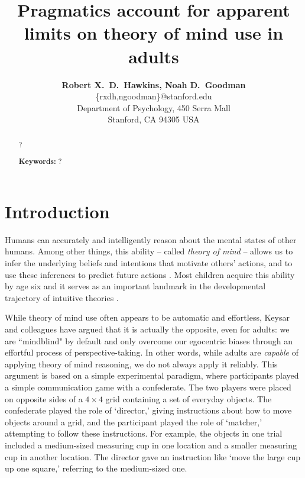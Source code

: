 \documentclass[10pt,letterpaper]{article}
\title{Pragmatics account for apparent limits on theory of mind use in adults}
\author{{\large \bf Robert X.~D.~Hawkins, Noah D.~Goodman}\\
  \{rxdh,ngoodman\}@stanford.edu\\
  Department of Psychology, 450 Serra Mall \\
  Stanford, CA 94305 USA}
\begin{document}
\maketitle

\begin{abstract}
?

\textbf{Keywords:} 
?
\end{abstract}

\section{Introduction}
\label{sec:intro}

Humans can accurately and intelligently reason about the mental states of other humans. Among other things, this ability -- called \emph{theory of mind} \cite{PremackWoodruff78_ChimpanzeeToM} -- allows us to infer the underlying beliefs and intentions that motivate others' actions, and to use these inferences to predict future actions \cite{BakerSaxeTenenbaum09_ActionUnderstandingInversePlanning}. Most children acquire this ability by age six \cite{WimmerPerner83_BeliefsAboutBeliefs, WellmanCrossWatson01_ToMMetaAnalysis} and it serves as an important landmark in the developmental trajectory of intuitive theories \cite{GopnikWellman12_ReconstructingConstructivism}.

While theory of mind use often appears to be automatic and effortless, Keysar and colleagues \cite{KeysarBarr___Brauner00_TakingPerspective, KeysarLinBarr03_LimitsOnTheoryOfMindUse, LinKeysarEpley10_ReflexivelyMindblind} have argued that it is actually the opposite, even for adults: we are ``mindblind" by default and only overcome our egocentric biases through an effortful process of perspective-taking. In other words, while adults are \emph{capable} of applying theory of mind reasoning, we do not always apply it reliably. This argument is based on a simple experimental paradigm, where participants played a simple communication game with a confederate. The two players were placed on opposite sides of a $4 \times 4$ grid containing a set of everyday objects. The confederate played the role of `director,' giving instructions about how to move objects around a grid, and the participant played the role of `matcher,' attempting to follow these instructions. For example, the objects in one trial included a medium-sized measuring cup in one location and a smaller measuring cup in another location. The director gave an instruction like `move the large cup up one square,' referring to the medium-sized one. 
\end{document}
